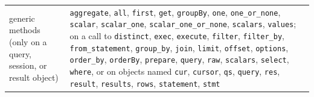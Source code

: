 {\begin{longtable}{@{}>{\raggedright\arraybackslash}p{}>{\raggedright\arraybackslash}p{}@{}}
generic methods (only on a query, session, or result object) & \texttt{aggregate}, \texttt{all}, \texttt{first}, \texttt{get}, \texttt{groupBy}, \texttt{one}, \texttt{one\_or\_none}, \texttt{scalar}, \texttt{scalar\_one}, \texttt{scalar\_one\_or\_none}, \texttt{scalars}, \texttt{values}; on a call to \texttt{distinct}, \texttt{exec}, \texttt{execute}, \texttt{filter}, \texttt{filter\_by}, \texttt{from\_statement}, \texttt{group\_by}, \texttt{join}, \texttt{limit}, \texttt{offset}, \texttt{options}, \texttt{order\_by}, \texttt{orderBy}, \texttt{prepare}, \texttt{query}, \texttt{raw}, \texttt{scalars}, \texttt{select}, \texttt{where}, or on objects named \texttt{cur}, \texttt{cursor}, \texttt{qs}, \texttt{query}, \texttt{res}, \texttt{result}, \texttt{results}, \texttt{rows}, \texttt{statement}, \texttt{stmt} \\
\end{longtable}

}
